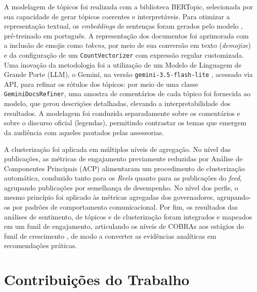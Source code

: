 A modelagem de tópicos foi realizada com a biblioteca BERTopic, selecionada por sua capacidade de gerar tópicos coerentes e interpretáveis. Para otimizar a representação textual, os \emph{embeddings} de sentenças foram gerados pelo modelo  \cite{rufimelo2024}, pré-treinado em português. A representação dos documentos foi aprimorada com a inclusão de emojis como \emph{tokens}, por meio de sua conversão em texto (\emph{demojize}) e da configuração de um \texttt{CountVectorizer} com expressão regular customizada. Uma inovação da metodologia foi a utilização de um Modelo de Linguagem de Grande Porte (LLM), o Gemini, na versão \texttt{gemini-3.5-flash-lite} \cite{google2026gemini}, acessado via API, para refinar os rótulos dos tópicos: por meio de uma classe \texttt{GeminiDocsRefiner}, uma amostra de comentários de cada tópico foi fornecida ao modelo, que gerou descrições detalhadas, elevando a interpretabilidade dos resultados. A modelagem foi conduzida separadamente sobre os comentários e sobre o discurso oficial (legendas), permitindo contrastar os temas que emergem da audiência com aqueles pautados pelas assessorias.

A clusterização foi aplicada em múltiplos níveis de agregação. No nível das publicações, as métricas de engajamento \textemdash{} previamente reduzidas por Análise de Componentes Principais (ACP) \textemdash{} alimentaram um procedimento de clusterização automática, conduzido tanto para os \emph{Reels} quanto para as publicações do \emph{feed}, agrupando publicações por semelhança de desempenho. No nível dos perfis, o mesmo princípio foi aplicado às métricas agregadas dos governadores, agrupando-os por padrões de comportamento comunicacional. Por fim, os resultados das análises de sentimento, de tópicos e de clusterização foram integrados e mapeados em um funil de engajamento, articulando os níveis de COBRAs \cite{muntinga2011} aos estágios do funil de crescimento \cite{feroz2024}, de modo a converter as evidências analíticas em recomendações práticas.

\section{Contribuições do Trabalho}

